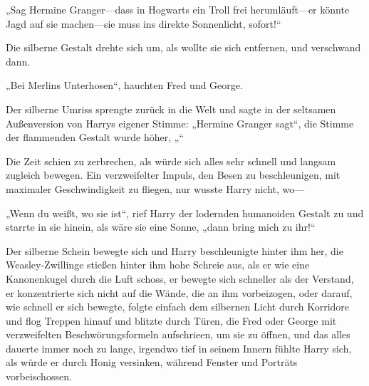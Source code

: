 „Sag Hermine Granger—dass in Hogwarts ein Troll frei herumläuft—er könnte Jagd auf sie machen—sie muss ins direkte Sonnenlicht, sofort!“

Die silberne Gestalt drehte sich um, als wollte sie sich entfernen, und verschwand dann.

„Bei Merlins Unterhosen“, hauchten Fred und George.

Der silberne Umriss sprengte zurück in die Welt und sagte in der seltsamen Außenversion von Harrys eigener Stimme: „Hermine Granger sagt“, die Stimme der flammenden Gestalt wurde höher, „“

Die Zeit schien zu zerbrechen, als würde sich alles sehr schnell und langsam zugleich bewegen. Ein verzweifelter Impuls, den Besen zu beschleunigen, mit maximaler Geschwindigkeit zu fliegen, nur wusste Harry nicht, wo—

„Wenn du weißt, wo sie ist“, rief Harry der lodernden humanoiden Gestalt zu und starrte in sie hinein, als wäre sie eine Sonne, „dann bring mich zu ihr!“

Der silberne Schein bewegte sich und Harry beschleunigte hinter ihm her, die Weasley-Zwillinge stießen hinter ihm hohe Schreie aus, als er wie eine Kanonenkugel durch die Luft schoss, er bewegte sich schneller als der Verstand, er konzentrierte sich nicht auf die Wände, die an ihm vorbeizogen, oder darauf, wie schnell er sich bewegte, folgte einfach dem silbernen Licht durch Korridore und flog Treppen hinauf und blitzte durch Türen, die Fred oder George mit verzweifelten Beschwörungsformeln aufschrieen, um sie zu öffnen, und das alles dauerte immer noch zu lange, irgendwo tief in seinem Innern fühlte Harry sich, als würde er durch Honig versinken, während Fenster und Porträts vorbeischossen.

